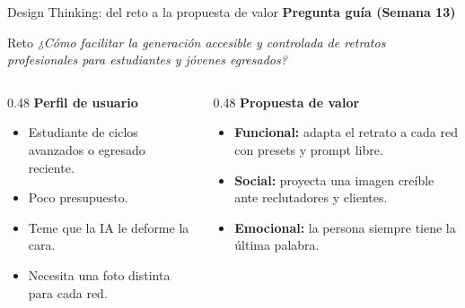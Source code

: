 \documentclass[aspectratio=169,11pt]{beamer}
\begin{document}
\begin{frame}{Design Thinking: del reto a la propuesta de valor}
  \textbf{Pregunta guía (Semana 13)}
  \begin{block}{Reto}
    \emph{¿Cómo facilitar la generación accesible y controlada de retratos profesionales para estudiantes y jóvenes egresados?}
  \end{block}

  \vspace{0.2em}
  \begin{columns}[T]
    \begin{column}{0.48\textwidth}
      \textbf{Perfil de usuario}
      \begin{itemize}
        \item Estudiante de ciclos avanzados o egresado reciente.
        \item Poco presupuesto.
        \item Teme que la IA le deforme la cara.
        \item Necesita una foto distinta para cada red.
      \end{itemize}
    \end{column}
    \begin{column}{0.48\textwidth}
      \textbf{Propuesta de valor}
      \begin{itemize}
        \item \textbf{Funcional:} adapta el retrato a cada red con presets y prompt libre.
        \item \textbf{Social:} proyecta una imagen creíble ante reclutadores y clientes.
        \item \textbf{Emocional:} la persona siempre tiene la última palabra.
      \end{itemize}
    \end{column}
  \end{columns}
\end{frame}
\end{document}
